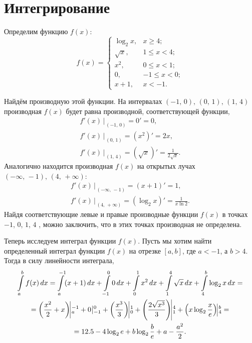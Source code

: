 \documentclass{article}
\begin{document}
    \section{Интегрирование}
    \hspace*{12pt} Определим функцию $f(x)$:
    \begin{equation} 
    	f(x) = \begin{cases} 
    	\log_2 x, & x \geqslant 4;\\
    	\sqrt{x}, & 1 \leqslant x < 4;\\ 
    	x^2, & 0 \leqslant x < 1;\\ 
    	0, & -1 \leqslant x < 0;\\ 
    	x + 1, & x < -1. 
    	\end{cases} 
    \end{equation}\par
    Найдём производную этой функции. На интервалах $(-1,\,0),\,(0,\,1),\,(1,\,4)$ производная $f(x)$ будет равна производной, соответствующей функции,
    \begin{gather} 
    f'(x)\,|_{\,(-1,\,0)} = 0' = 0,\\ 
    f'(x)\,|_{\,(0,\,1)} = (x^2)' = 2x,\\ 
    f'(x)\,|_{\,(1,\,4)} = (\sqrt x)' = \frac{1}{2\sqrt{x}}. 
    \end{gather}
    Аналогично находится производная $f(x)$ на открытых лучах $(-\infty,\,-1),\,(4,\,+\infty)$:
    \begin{gather} 
    f'(x)\,|_{\,(-\infty,\,-1)} = (x + 1)' = 1,\\ 
    f'(x)\,|_{\,(4,\,+\infty)} = (\log_2 x)' = \frac{1}{x\ln{2} }. 
    \end{gather}
    Найдя соответствующие левые и правые производные функции $f(x)$ в точках $-1$, $0$, $1$, $4$ , можно заключить, что в этих точках производная не определена.\par
    Теперь исследуем интеграл функции $f(x)$. Пусть мы хотим найти определенный интеграл функции $f(x)$ на отрезке $[a, b]$, где $a < -1$, а $b > 4$. Тогда в силу линейности интеграла,
    \begin{multline} 
    \int\limits_{a}^{b}f(x)\,dx = \int\limits_{a}^{-1}(x+1)\,dx + \int\limits_{-1}^{0} 0\,dx + \int\limits_{0}^{1} x^2\,dx + \int\limits_{1}^{4} \sqrt x\,dx + \int\limits_{4}^{b} \log_2 x\,dx =\\ 
    = {\left(\frac{x^2}{2}+x\right) \vline_a^{-1}} + {0\,\vline_{\,-1}^{\,0}} +{ \left(\frac{x^3}{3}\right) \vline_{0}^{1}} + {\left(\frac{2\sqrt{x^3}}{3}\right) \vline_{1}^{4}} + {\left( x\log_2\frac{x}{e}\right) \vline_{4}^{b}} = \\ 
    = 12.5 - 4\log_2 e + b\log_2 \frac{b}{e} + a - \frac{a^2}{2}. 
    \end{multline}
\end{document}
